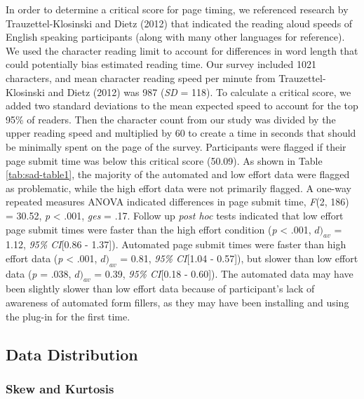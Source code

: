 \documentclass[english,man]{apa6}
\theoremstyle{definition}
\theoremstyle{definition}
\theoremstyle{definition}
\theoremstyle{remark}
\begin{document}
In order to determine a critical score for page timing, we referenced
research by Trauzettel-Klosinski and Dietz (2012) that indicated the
reading aloud speeds of English speaking participants (along with many
other languages for reference). We used the character reading limit to
account for differences in word length that could potentially bias
estimated reading time. Our survey included 1021 characters, and mean
character reading speed per minute from Trauzettel-Klosinski and Dietz
(2012) was 987 (\emph{SD} = 118). To calculate a critical score, we
added two standard deviations to the mean expected speed to account for
the top 95\% of readers. Then the character count from our study was
divided by the upper reading speed and multiplied by 60 to create a time
in seconds that should be minimally spent on the page of the survey.
Participants were flagged if their page submit time was below this
critical score (50.09). As shown in Table \ref{tab:sad-table1}, the
majority of the automated and low effort data were flagged as
problematic, while the high effort data were not primarily flagged. A
one-way repeated measures ANOVA indicated differences in page submit
time, \emph{F}(2, 186) = 30.52, \emph{p} \textless{} .001, \emph{ges} =
.17. Follow up \emph{post hoc} tests indicated that low effort page
submit times were faster than the high effort condition (\emph{p}
\textless{} .001, \(d)_{av}\) = 1.12, \emph{95\% CI}{[}0.86 - 1.37{]}).
Automated page submit times were faster than high effort data (\emph{p}
\textless{} .001, \(d)_{av}\) = 0.81, \emph{95\% CI}{[}1.04 - 0.57{]}),
but slower than low effort data (\emph{p} = .038, \(d)_{av}\) = 0.39,
\emph{95\% CI}{[}0.18 - 0.60{]}). The automated data may have been
slightly slower than low effort data because of participant's lack of
awareness of automated form fillers, as they may have been installing
and using the plug-in for the first time.

\subsection{Data Distribution}\label{data-distribution-1}

\subsubsection{Skew and Kurtosis}\label{skew-and-kurtosis}
\end{document}
